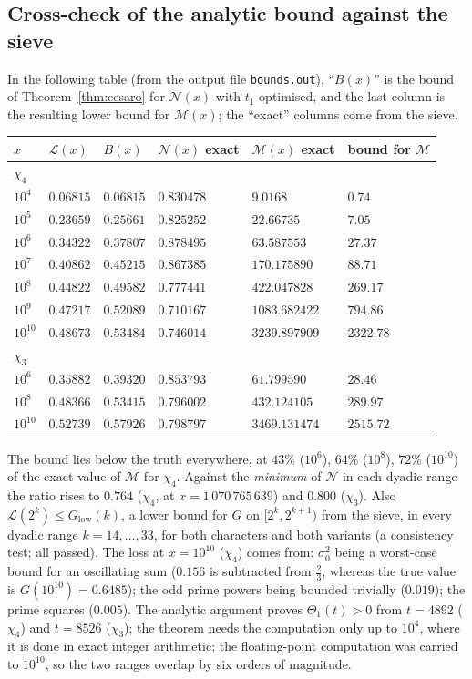 \documentclass[11pt]{amsart}
\theoremstyle{definition}
\numberwithin{equation}{section}
\newcommand{\cM}{\mathcal M}          %
\newcommand{\cN}{\mathcal N}          %
\newcommand{\cL}{\mathcal L}          %
\begin{document}
\subsection{Cross-check of the analytic bound against the sieve}

In the following table (from the output file \texttt{bounds.out}),
``$B(x)$'' is
the bound of Theorem~\ref{thm:cesaro} for $\cN(x)$ with $t_1$
optimised, and the last column is the resulting lower bound for
$\cM(x)$; the ``exact'' columns come from the sieve.

\begin{center}
\small
\begin{tabular}{llllll}
\toprule
$x$ & $\cL(x)$ & $B(x)$ & $\cN(x)$ exact & $\cM(x)$ exact &
bound for $\cM$\\
\midrule
\multicolumn{6}{l}{$\chi_4$}\\
$10^4$ & $0.06815$ & $0.06815$ & $0.830478$ & $9.0168$ & $0.74$\\
$10^5$ & $0.23659$ & $0.25661$ & $0.825252$ & $22.66735$ & $7.05$\\
$10^6$ & $0.34322$ & $0.37807$ & $0.878495$ & $63.587553$ & $27.37$\\
$10^7$ & $0.40862$ & $0.45215$ & $0.867385$ & $170.175890$ & $88.71$\\
$10^8$ & $0.44822$ & $0.49582$ & $0.777441$ & $422.047828$ & $269.17$\\
$10^9$ & $0.47217$ & $0.52089$ & $0.710167$ & $1083.682422$ &
$794.86$\\
$10^{10}$ & $0.48673$ & $0.53484$ & $0.746014$ & $3239.897909$ &
$2322.78$\\
\midrule
\multicolumn{6}{l}{$\chi_3$}\\
$10^6$ & $0.35882$ & $0.39320$ & $0.853793$ & $61.799590$ & $28.46$\\
$10^8$ & $0.48366$ & $0.53415$ & $0.796002$ & $432.124105$ &
$289.97$\\
$10^{10}$ & $0.52739$ & $0.57926$ & $0.798797$ & $3469.131474$ &
$2515.72$\\
\bottomrule
\end{tabular}
\end{center}

The bound lies below the truth everywhere, at $43\%$ ($10^6$), $64\%$
($10^8$), $72\%$ ($10^{10}$) of the exact value of $\cM$ for
$\chi_4$. Against the \emph{minimum} of $\cN$ in each dyadic range
the ratio rises to $0.764$ ($\chi_4$, at $x=1\,070\,765\,639$) and
$0.800$ ($\chi_3$). Also $\cL(2^k)\le G_{\mathrm{low}}(k)$, a lower
bound for $G$ on $[2^k,2^{k+1})$ from the sieve, in every dyadic
range $k=14,\dots,33$, for both characters and both variants (a
consistency test; all passed). The loss at $x=10^{10}$ ($\chi_4$)
comes from: $\sigma_0^2$ being a worst-case bound for an oscillating
sum ($0.156$ is subtracted from $\tfrac23$, whereas the true value is
$G(10^{10})=0.6485$); the odd prime powers being bounded trivially
($0.019$); the prime squares ($0.005$). The analytic argument proves
$\Theta_1(t)>0$ from $t=4892$ ($\chi_4$) and $t=8526$ ($\chi_3$); the
theorem needs the computation only up to $10^4$, where it is done in
exact integer arithmetic; the floating-point computation was carried
to $10^{10}$, so the two ranges overlap by six orders of magnitude.
\end{document}
